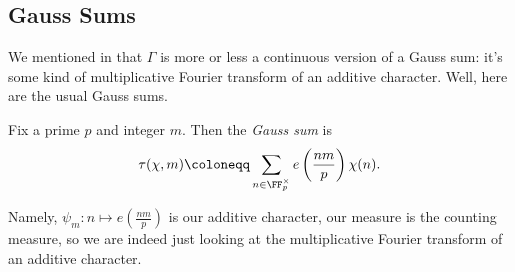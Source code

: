 \documentclass[../notes.tex]{subfiles}
\begin{document}
\subsection{Gauss Sums}
We mentioned in  that $\Gamma$ is more or less a continuous version of a Gauss sum: it's some kind of multiplicative Fourier transform of an additive character. Well, here are the usual Gauss sums.
\begin{definition}
	Fix a prime $p$ and integer $m$. Then the \textit{Gauss sum} is
	\[\tau(\chi,m)\coloneqq\sum_{n\in\FF_p^\times}e\left(\frac{nm}p\right)\chi(n).\]
\end{definition}
Namely, $\psi_m\colon n\mapsto e\left(\frac{nm}p\right)$ is our additive character, our measure is the counting measure, so we are indeed just looking at the multiplicative Fourier transform of an additive character.
\end{document}
